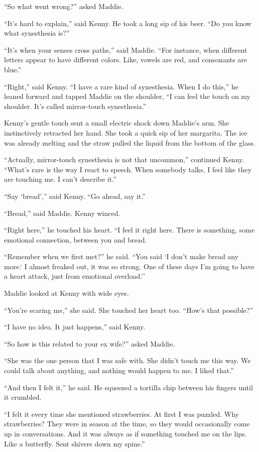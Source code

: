 \documentclass{memoir}
\begin{document}
``So what went wrong?'' asked Maddie.

``It's hard to explain,'' said Kenny. He took a long sip of his beer. ``Do you know what synesthesia is?''

``It's when your senses cross paths,'' said Maddie. ``For instance, when different letters appear to have different colors. Like, vowels are red, and consonants are blue.''

``Right,'' said Kenny. ``I have a rare kind of synesthesia. When I do this,'' he leaned forward and tapped Maddie on the shoulder, ``I can feel the touch on my shoulder. It's called mirror-touch synesthesia.'' 

Kenny's gentle touch sent a small electric shock down Maddie's arm. She instinctively retracted her hand. She took a quick sip of her margarita. The ice was already melting and the straw pulled the liquid from the bottom of the glass.

``Actually, mirror-touch synesthesia is not that uncommon,'' continued Kenny. ``What's rare is the way I react to speech. When somebody talks, I feel like they are touching me. I can't describe it.''

``Say `bread','' said Kenny. ``Go ahead, say it.''

``Bread,'' said Maddie. 
Kenny winced. 

``Right here,'' he touched his heart. ``I feel it right here. There is something, some emotional connection, between you and bread.

``Remember when we first met?'' he said. ``You said `I don't make bread any more.` I almost freaked out, it was so strong. One of these days I'm going to have a heart attack, just from emotional overload.''

Maddie looked at Kenny with wide eyes.

``You're scaring me,'' she said. She touched her heart too. ``How's that possible?''

``I have no idea. It just happens,'' said Kenny. 

``So how is this related to your ex wife?'' asked Maddie.

``She was the one person that I was safe with. She didn't touch me this way. We could talk about anything, and nothing would happen to me. I liked that.''

``And then I felt it,'' he said. He squeezed a tortilla chip between his fingers until it crumbled. 

``I felt it every time she mentioned strawberries. At first I was puzzled. Why strawberries? They were in season at the time, so they would occasionally come up in conversations. And it was always as if something touched me on the lips. Like a butterfly. Sent shivers down my spine.''
\end{document}
